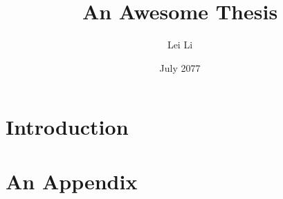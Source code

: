 \documentclass[colourful]{strw-msc}
\title{An Awesome Thesis}
\author{Lei Li}
\date{July 2077}
\affiliation{Leiden Observatory, Leiden University}
\begin{document}
\frontmatter





\tableofcontents

\mainmatter

\chapter{Introduction}




\appendix
\chapter{An Appendix}


\end{document}
